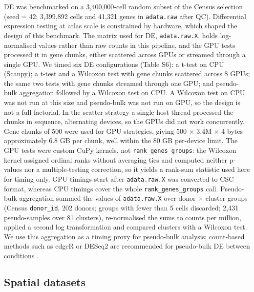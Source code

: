 \documentclass[runningheads]{llncs}
\begin{document}
DE was benchmarked on a 3,400,000-cell random subset of the Census selection (seed = 42; 3,399,892 cells and 41,321 genes in \texttt{adata.raw} after QC). Differential expression testing at atlas scale is constrained by hardware, which shaped the design of this benchmark. The matrix used for DE, \texttt{adata.raw.X}, holds log-normalised values rather than raw counts in this pipeline, and the GPU tests processed it in gene chunks, either scattered across GPUs or streamed through a single GPU. We timed six DE configurations (Table S6): a t-test on CPU (Scanpy); a t-test and a Wilcoxon test with gene chunks scattered across 8 GPUs; the same two tests with gene chunks streamed through one GPU; and pseudo-bulk aggregation followed by a Wilcoxon test on CPU. A Wilcoxon test on CPU was not run at this size and pseudo-bulk was not run on GPU, so the design is not a full factorial. In the scatter strategy a single host thread processed the chunks in sequence, alternating devices, so the GPUs did not work concurrently. Gene chunks of 500 were used for GPU strategies, giving 500 $\times$ 3.4M $\times$ 4 bytes approximately 6.8 GB per chunk, well within the 80 GB per-device limit. The GPU tests were custom CuPy kernels, not \texttt{rank\_\allowbreak{}genes\_\allowbreak{}groups}: the Wilcoxon kernel assigned ordinal ranks without averaging ties and computed neither p-values nor a multiple-testing correction, so it yields a rank-sum statistic used here for timing only. GPU timings start after \texttt{adata.raw.X} was converted to CSC format, whereas CPU timings cover the whole \texttt{rank\_\allowbreak{}genes\_\allowbreak{}groups} call. Pseudo-bulk aggregation summed the values of \texttt{adata.raw.X} over donor $\times$ cluster groups (Census \texttt{donor\_\allowbreak{}id}, 202 donors; groups with fewer than 5 cells discarded; 2,431 pseudo-samples over 81 clusters), re-normalised the sums to counts per million, applied a second log transformation and compared clusters with a Wilcoxon test. We use this aggregation as a timing proxy for pseudo-bulk analysis; count-based methods such as edgeR or DESeq2 are recommended for pseudo-bulk DE between conditions \cite{Squair2021}.

\hypertarget{spatial-datasets}{%
\subsection{Spatial datasets}\label{spatial-datasets}}
\end{document}
